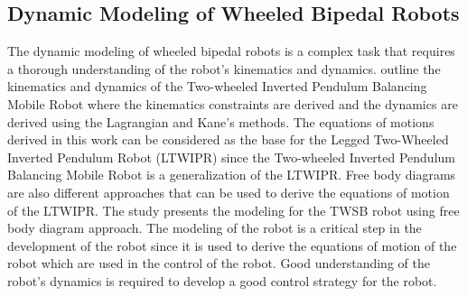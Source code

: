 \subsection{Dynamic Modeling of Wheeled Bipedal Robots}
The dynamic modeling of wheeled bipedal robots is a complex task that requires a thorough understanding of the robot's kinematics and dynamics.
 \cite{kim2015dynamic} outline the kinematics and dynamics of the Two-wheeled Inverted Pendulum Balancing
Mobile Robot where the kinematics constraints are derived and the dynamics are derived using the Lagrangian and Kane's methods.
The equations of motions derived in this work can be considered as the base for the Legged Two-Wheeled Inverted Pendulum Robot (LTWIPR) since the Two-wheeled Inverted Pendulum Balancing Mobile Robot is a generalization of the LTWIPR. Free body diagrams are also different approaches that can be used to derive the equations of motion of the LTWIPR. The study \cite{zimit2018modelling} presents the modeling for the TWSB robot using free body diagram approach.
The modeling of the robot is a critical step in the development of the robot since it is used to derive the equations of motion of the robot which are used in the control of the robot.
Good understanding of the robot's dynamics is required to develop a good control strategy for the robot.



